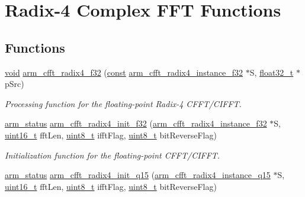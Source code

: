 \hypertarget{group___radix4___c_f_f_t___c_i_f_f_t}{\section{Radix-\/4 Complex F\-F\-T Functions}
\label{group___radix4___c_f_f_t___c_i_f_f_t}
}
\subsection*{Functions}
\begin{DoxyCompactItemize}
\item 
\hyperlink{group___n_a_m_e_ga18028b8badbf1ea7e704ccac3c488e82}{void} \hyperlink{group___radix4___c_f_f_t___c_i_f_f_t_ga521f670cd9c571bc61aff9bec89f4c26}{arm\-\_\-cfft\-\_\-radix4\-\_\-f32} (\hyperlink{group___n_a_m_e_ga7ae6d0e43244213b34de2c2b9aa30da6}{const} \hyperlink{structarm__cfft__radix4__instance__f32}{arm\-\_\-cfft\-\_\-radix4\-\_\-instance\-\_\-f32} $\ast$S, \hyperlink{arm__math_8h_a4611b605e45ab401f02cab15c5e38715}{float32\-\_\-t} $\ast$p\-Src)
\begin{DoxyCompactList}\small\item\em Processing function for the floating-\/point Radix-\/4 C\-F\-F\-T/\-C\-I\-F\-F\-T. \end{DoxyCompactList}\item 
\hyperlink{arm__math_8h_a5e459c6409dfcd2927bb8a57491d7cf6}{arm\-\_\-status} \hyperlink{group___radix4___c_f_f_t___c_i_f_f_t_gaf336459f684f0b17bfae539ef1b1b78a}{arm\-\_\-cfft\-\_\-radix4\-\_\-init\-\_\-f32} (\hyperlink{structarm__cfft__radix4__instance__f32}{arm\-\_\-cfft\-\_\-radix4\-\_\-instance\-\_\-f32} $\ast$S, \hyperlink{stdint_8h_a273cf69d639a59973b6019625df33e30}{uint16\-\_\-t} fft\-Len, \hyperlink{stdint_8h_aba7bc1797add20fe3efdf37ced1182c5}{uint8\-\_\-t} ifft\-Flag, \hyperlink{stdint_8h_aba7bc1797add20fe3efdf37ced1182c5}{uint8\-\_\-t} bit\-Reverse\-Flag)
\begin{DoxyCompactList}\small\item\em Initialization function for the floating-\/point C\-F\-F\-T/\-C\-I\-F\-F\-T. \end{DoxyCompactList}\item 
\hyperlink{arm__math_8h_a5e459c6409dfcd2927bb8a57491d7cf6}{arm\-\_\-status} \hyperlink{group___radix4___c_f_f_t___c_i_f_f_t_ga0c2acfda3126c452e75b81669e8ad9ef}{arm\-\_\-cfft\-\_\-radix4\-\_\-init\-\_\-q15} (\hyperlink{structarm__cfft__radix4__instance__q15}{arm\-\_\-cfft\-\_\-radix4\-\_\-instance\-\_\-q15} $\ast$S, \hyperlink{stdint_8h_a273cf69d639a59973b6019625df33e30}{uint16\-\_\-t} fft\-Len, \hyperlink{stdint_8h_aba7bc1797add20fe3efdf37ced1182c5}{uint8\-\_\-t} ifft\-Flag, \hyperlink{stdint_8h_aba7bc1797add20fe3efdf37ced1182c5}{uint8\-\_\-t} bit\-Reverse\-Flag)

\end{DoxyCompactItemize}
